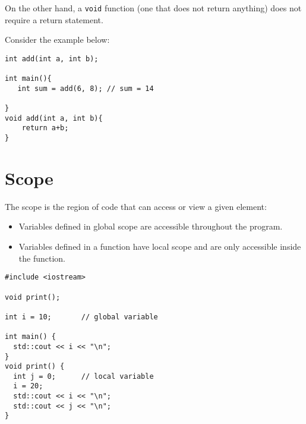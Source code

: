 On the other hand, a \verb!void! function (one that does not return anything) does not require a return statement.

Consider the example below: 
\begin{verbatim}
int add(int a, int b);

int main(){
   int sum = add(6, 8); // sum = 14
    
}
void add(int a, int b){
    return a+b;
}
\end{verbatim}

\section{Scope}
The scope is the region of code that can access or view a given element:

\begin{itemize}
    \item Variables defined in global scope are accessible throughout the program.
    \item Variables defined in a function have local scope and are only accessible inside the function.
\end{itemize}

\begin{verbatim}
#include <iostream>
 
void print();
 
int i = 10;       // global variable
 
int main() { 
  std::cout << i << "\n"; 
}
void print() { 
  int j = 0;      // local variable
  i = 20;
  std::cout << i << "\n"; 
  std::cout << j << "\n";
}
\end{verbatim}